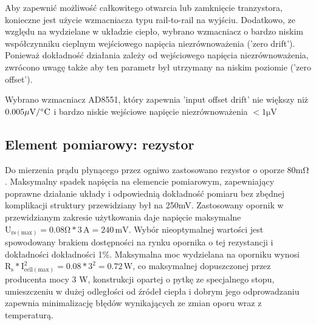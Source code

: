 \documentclass[polish,engineer]{polsl-msth}
\begin{document}
Aby zapewnić możliwość całkowitego otwarcia lub zamknięcie tranzystora, konieczne jest użycie wzmacniacza typu rail-to-rail na wyjściu. Dodatkowo, ze względu na wydzielane w układzie ciepło, wybrano wzmacniacz o bardzo niskim współczynniku cieplnym wejściowego napięcia niezrównoważenia ('zero drift'). Ponieważ dokładność działania zależy od wejściowego napięcia niezrównoważenia, zwrócono uwagę także aby ten parametr był utrzymany na niskim poziomie ('zero offset').

Wybrano wzmacniacz AD8551, który zapewnia 'input offset drift' nie większy niż $\mathrm{0.005 \mu V/\degree C}$ i bardzo niskie wejściowe napięcie niezrównoważenia $\mathrm{<1\mu V}$
\subsection{Element pomiarowy: rezystor}
Do mierzenia prądu płynącego przez ogniwo zastosowano rezystor o oporze $\mathrm{80m\Omega}$. Maksymalny spadek napięcia na elemencie pomiarowym, zapewniający poprawne działanie układy i odpowiednią dokładność pomiaru bez zbędnej komplikacji struktury przewidziany był na 250mV. Zastosowany opornik w przewidzianym zakresie użytkowania daje napięcie maksymalne $\mathrm{U_{rs(max)}=0.08\Omega * 3\,A = 240\,mV}$. Wybór nieoptymalnej wartości jest spowodowany brakiem dostępności na rynku opornika o tej rezystancji i dokładności dokładności 1\%. Maksymalna moc wydzielana na oporniku wynosi $\mathrm{R_s*I_{cell(max)}^2 = 0.08*3^2 = 0.72\,W}$, co maksymalnej dopuszczonej przez producenta mocy 3 W, konstrukcji opartej o pytkę ze specjalnego stopu, umieszczeniu w dużej odległości od źródeł ciepła i dobrym jego odprowadzaniu zapewnia minimalizację błędów wynikających ze zmian oporu wraz z temperaturą.
\end{document}
